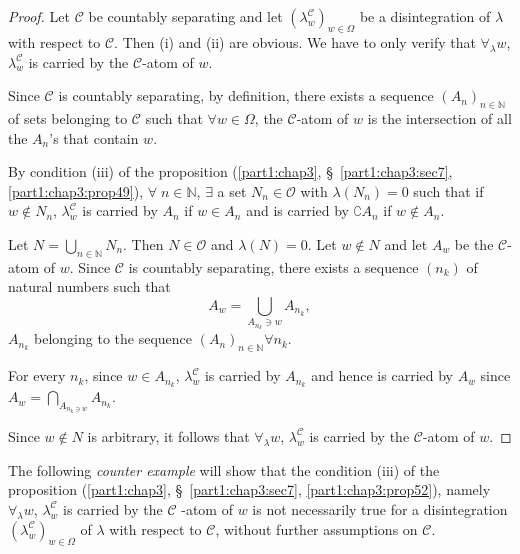 \begin{proof}
Let $\mathscr{C}$ be countably separating and let
$(\lambda^\mathscr{C}_w)_{w \in \Omega}$ be a disintegration of
$\lambda$ with respect to $\mathscr{C}$. Then (i) and (ii) are
obvious. We have to only verify that $\forall_\lambda w$,
$\lambda^\mathscr{C}_w$ is carried by the $\mathscr{C}$-atom of $w$. 

Since $\mathscr{C}$ is countably separating, by definition, there
exists a sequence $(A_n)_{n \in \mathbb{N}}$ of sets belonging to
$\mathscr{C}$ such that $\forall w \in\Omega$, the $\mathscr{C}$-atom
of $w$ is the intersection of all the $A_n$'s that contain $w$. 

By condition (iii) of the proposition (\ref{part1:chap3},
\S\ \ref{part1:chap3:sec7}, \ref{part1:chap3:prop49}), $\forall \; n 
\in \mathbb{N}$, $\exists$ a set $N_n \in \mathscr{O}$ with
$\lambda(N_n) =0$ such that if $w \not\in N_n$,
$\lambda^\mathscr{C}_w$ is carried by $A_n$ if $w \in A_n$ and is
carried by $\complement A_n$ if $w \not\in A_n$.


Let $N = \bigcup\limits_{n \in\mathbb{N}} N_n$. Then $N \in
\mathscr{O}$ and $\lambda(N) = 0$. Let $w \not\in N$ and let $A_w$ be
the $\mathscr{C}$-atom of $w$. Since $\mathscr{C}$ is countably
separating, there exists a sequence $(n_k)$ of natural numbers such
that 
$$
A_w = \bigcup\limits_{A_{n_k} \ni w} A_{n_k}, 
$$
$A_{n_k}$ belonging to the sequence $(A_n)_{n \in \mathbb{N}} \forall
n_k$. 

For every $n_k$, since $w \in A_{n_k}$, $\lambda^\mathscr{C}_w$ is
carried by $A_{n_k}$ and hence is carried by $A_w$ since $A_w =
\bigcap\limits_{A_{n_k \ni w}} A_{n_k}$. 

Since $w \not\in N$ is arbitrary, it follows that $\forall_\lambda
w$, $\lambda^\mathscr{C}_w$ is carried by the $\mathscr{C}$-atom of $w$.
\end{proof}

The following {\em counter example} will show that the condition (iii)
of the proposition (\ref{part1:chap3}, \S\ \ref{part1:chap3:sec7},
\ref{part1:chap3:prop52}), namely $\forall_{\lambda} w$, 
$\lambda^\mathscr{C}_w$ is carried by the $\mathscr{C}$ -atom of $w$
is not necessarily true for a disintegration
$(\lambda^\mathscr{C}_w)_{w \in \Omega}$ of $\lambda$ with respect to
$\mathscr{C}$, without further assumptions on $\mathscr{C}$. 

